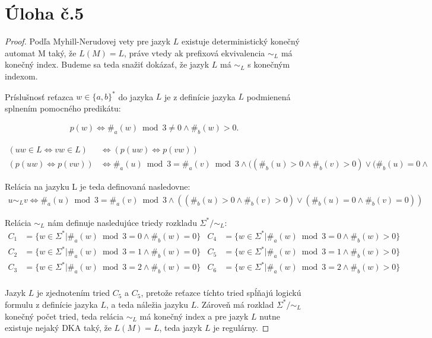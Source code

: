 \documentclass[10pt]{article}
\begin{document}
\section*{Úloha č.5}
\begin{proof}
Podľa Myhill-Nerudovej vety pre jazyk $L$ existuje deterministický konečný automat M taký, že $L(M)
= L$, práve vtedy ak prefixová ekvivalencia $\sim_L$ má konečný index. Budeme sa teda snažiť
dokázať, že jazyk $L$ má $\sim_L$ s konečným indexom.

Príslušnosť reťazca $w \in \{a, b\}^*$ do jazyka $L$ je z definície jazyka $L$ podmienená splnením 
   pomocného predikátu:
    
\begin{align*}
    p(w) \iff \#_a(w) \bmod 3 \neq 0 \land \#_b(w) > 0.
\end{align*}

\begin{align*}
    (uw \in L \iff vw \in L) &\iff (p(uw) \iff p(vw)) \\
    (p(uw) \iff p(vw))  &\iff \#_a(u)\bmod 3 = \#_a(v)\bmod 3 \land ((\#_b(u) > 0 \land \#_b(v) > 0) \lor (\#_b(u) = 0 \land
\end{align*}
 
    
Relácia na jazyku L je teda definovaná nasledovne:
\begin{align*}
u \sim_L v \iff \#_a(u)\bmod 3 = \#_a(v)\bmod 3 \land ((\#_b(u) > 0 \land \#_b(v) > 0) \lor (\#_b(u) = 0 \land
\#_b(v) = 0))
\end{align*}

Relácia $\sim_L$ nám definuje nasledujúce triedy rozkladu $\Sigma^* / \sim_L$:
\begin{align*}
    C_1 &= \{ w \in \Sigma^* | \#_a(w) \bmod 3 = 0 \land \#_b(w) = 0 \} & C_4 &= \{ w \in \Sigma^* | \#_a(w) \bmod 3 = 0 \land \#_b(w) > 0 \} \\
    C_2 &= \{ w \in \Sigma^* | \#_a(w) \bmod 3 = 1 \land \#_b(w) = 0 \} & C_5 &= \{ w \in \Sigma^* | \#_a(w) \bmod 3 = 1 \land \#_b(w) > 0 \} \\
    C_3 &= \{ w \in \Sigma^* | \#_a(w) \bmod 3 = 2 \land \#_b(w) = 0 \} & C_6 &= \{ w \in \Sigma^* | \#_a(w) \bmod 3 = 2 \land \#_b(w) > 0 \} \\
\end{align*}

Jazyk $L$ je zjednotením tried $C_5$ a $C_5$, pretože reťazce tíchto tried spĺňajú logickú formulu
z definície jazyka $L$, a teda náležia jazyku $L$. Zároveň má rozklad $\Sigma^* / \sim_L$ konečný
počet tried, teda relácia $\sim_L$ má konečný index a pre jazyk $L$ nutne existuje nejaký DKA taký,
že $L(M) = L$, teda jazyk $L$ je regulárny. 

\end{proof}
\end{document}

